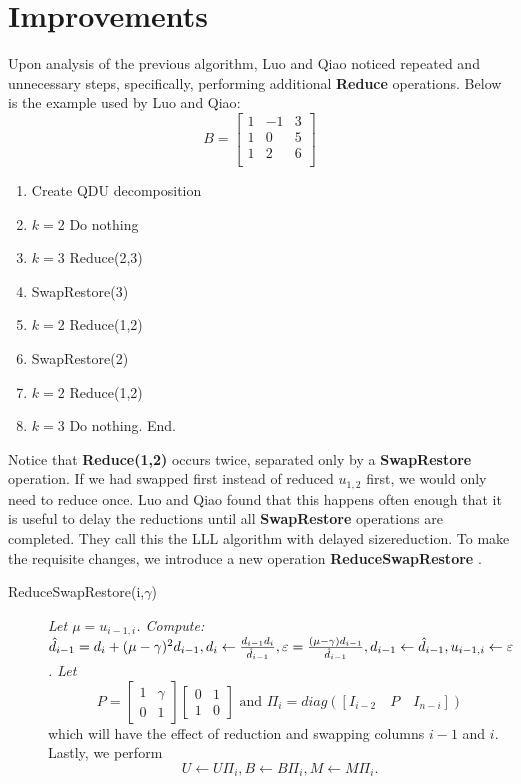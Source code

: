 \documentclass[12pt]{article}
\numberwithin{equation}{section}
\numberwithin{table}{section}
\numberwithin{figure}{section}
\begin{document}
\section{Improvements}
Upon analysis of the previous algorithm, Luo and Qiao noticed repeated and unnecessary steps, specifically, performing additional \textbf{Reduce} operations\cite{LuoQiaoParallelLLL}. Below is the example used by Luo and Qiao\cite{LuoQiaoParallelLLL}:
$$
B=\left[
\begin{array}{ccc}
1 & -1 & 3 \\
1 & 0 & 5 \\
1 & 2 & 6 \\
\end{array}\right]
$$
\begin{enumerate}[1)]
\item Create QDU decomposition
\item $k=2$ Do nothing
\item $k=3$ Reduce(2,3)
\item SwapRestore(3)
\item $k=2$ Reduce(1,2)
\item SwapRestore(2)
\item $k=2$ Reduce(1,2)
\item $k=3$ Do nothing. End.
\end{enumerate}
Notice that \textbf{Reduce(1,2)} occurs twice, separated only by a \textbf{SwapRestore} operation. If we had swapped first instead of reduced $u_{1,2}$ first, we would only need to reduce once. Luo and Qiao found that this happens often enough that it is useful to delay the reductions until all \textbf{SwapRestore} operations are completed. They call this the LLL algorithm with delayed size\-reduction. To make the requisite changes, we introduce a new operation \textbf{ReduceSwapRestore} \cite{LuoQiaoParallelLLL}.
\begin{description}
\item[ReduceSwapRestore(i,$\gamma$)] \textit{Let $\mu=u_{i-1,i}$. Compute: $\hat{d}_{i-1}=d_i+(\mu-\gamma)^2 d_{i-1}, d_i\leftarrow \frac{d_{i-1}d_i}{\hat{d}_{i-1}}, \varepsilon=\frac{(\mu-\gamma)d_{i-1}}{\hat{d}_{i-1}}, 
\\d_{i-1}\leftarrow \hat{d}_{i-1},u_{i-1,i}\leftarrow \varepsilon$. Let}
$$P=\left[\begin{array}{cc}
1 &\gamma \\
0 &1
\end{array}\right]\left[\begin{array}{cc}
0 &1 \\
1 &0
\end{array}\right]\text{ and } \Pi_i=diag([I_{i-2}\hspace{1em}P\hspace{1em}I_{n-i}])$$
which will have the effect of reduction and swapping columns $i-1$ and $i$.
Lastly, we perform
$$U\leftarrow U\Pi_i, B\leftarrow B\Pi_i, M\leftarrow M\Pi_i.$$
\end{description}
\end{document}
